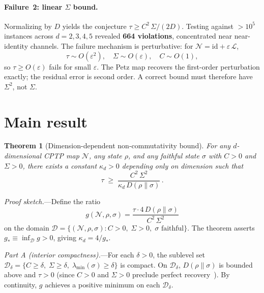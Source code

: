 \documentclass[prl,twocolumn,superscriptaddress,longbibliography,floatfix]{revtex4-2}
\newtheorem{theorem}{Theorem}
\newcommand{\id}{\mathrm{id}}
\newcommand{\chan}{\mathcal{N}}
\newcommand{\tauasym}{\tau}
\newcommand{\kd}{\kappa_d}
\begin{document}
\paragraph{Failure~2: linear $\Sigma$ bound.}
Normalizing by $D$ yields the conjecture
$\tauasym \geq C^2\,\Sigma/(2D)$.
Testing against $>10^5$ instances across $d = 2,3,4,5$
revealed \textbf{664 violations}, concentrated near
near-identity channels.
The failure mechanism is perturbative:
for $\chan = \id + \varepsilon\,\mathcal{L}$,
\begin{equation}
\tauasym \sim O(\varepsilon^2), \quad
\Sigma \sim O(\varepsilon), \quad
C \sim O(1),
\label{eq:perturbative}
\end{equation}
so $\tauasym \geq O(\varepsilon)$ fails for small
$\varepsilon$.
The Petz map recovers the first-order perturbation
exactly; the residual error is second order.
A correct bound must therefore have $\Sigma^2$, not
$\Sigma$.

\section{Main result}
\label{sec:result}

\begin{theorem}[Dimension-dependent non-commutativity bound]
\label{thm:main}
For any $d$-dimensional CPTP map $\chan$, any state $\rho$,
and any faithful state $\sigma$ with $C > 0$ and
$\Sigma > 0$, there exists a constant $\kd > 0$
depending only on dimension such that
\begin{equation}
\tauasym \;\geq\; \frac{C^2\, \Sigma^2}
  {\kd\, D(\rho\|\sigma)}\,.
\label{eq:main_thm}
\end{equation}
\end{theorem}

\emph{Proof sketch.}---Define the ratio
\begin{equation}
g(\chan, \rho, \sigma)
= \frac{\tauasym \cdot 4\,D(\rho\|\sigma)}{C^2\, \Sigma^2}
\label{eq:g_def}
\end{equation}
on the domain
$\mathcal{D} = \{(\chan, \rho, \sigma) :
C > 0,\; \Sigma > 0,\; \sigma \text{ faithful}\}$.
The theorem asserts $g_* \equiv \inf_{\mathcal{D}} g > 0$,
giving $\kd = 4/g_*$.

\emph{Part A (interior compactness).}---For each
$\delta > 0$, the sublevel set
$\mathcal{D}_\delta = \{C \geq \delta,\;
\Sigma \geq \delta,\; \lambda_{\min}(\sigma) \geq \delta\}$
is compact. On $\mathcal{D}_\delta$,
$D(\rho\|\sigma)$ is bounded above and $\tauasym > 0$
(since $C > 0$ and $\Sigma > 0$ preclude perfect
recovery~\cite{Huang2026}).
By continuity, $g$ achieves a positive minimum on each
$\mathcal{D}_\delta$.
\end{document}
